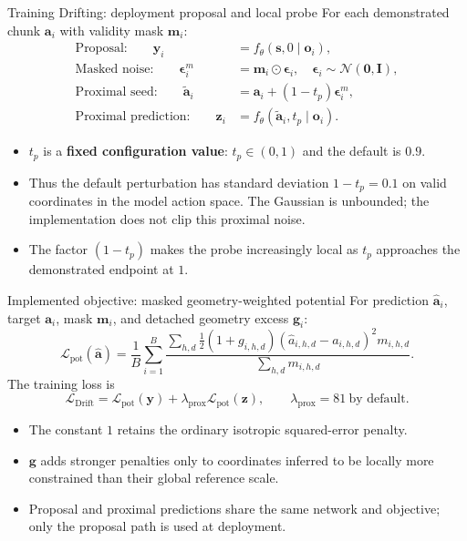 \documentclass[aspectratio=169,10pt]{beamer}
\newcommand{\vect}[1]{\mathbf{#1}}
\begin{document}
\begin{frame}{Training Drifting: deployment proposal and local probe}
  \small
  For each demonstrated chunk $\vect{a}_i$ with validity mask $\vect{m}_i$:
  \begin{align*}
    \text{Proposal:}\qquad
      \vect{y}_i
      &= f_\theta(\vect{s},0\mid\vect{o}_i),\\
    \text{Masked noise:}\qquad
      \boldsymbol{\epsilon}_i^{m}
      &= \vect{m}_i\odot\boldsymbol{\epsilon}_i,
      \quad \boldsymbol{\epsilon}_i\sim\mathcal{N}(\vect{0},\vect{I}),\\
    \text{Proximal seed:}\qquad
      \tilde{\vect{a}}_i
      &= \vect{a}_i+(1-t_p)\boldsymbol{\epsilon}_i^{m},\\
    \text{Proximal prediction:}\qquad
      \vect{z}_i
      &=f_\theta(\tilde{\vect{a}}_i,t_p\mid\vect{o}_i).
  \end{align*}

  \begin{itemize}
    \item $t_p$ is a \textbf{fixed configuration value}:
          $t_p\in(0,1)$ and the default is $0.9$.
    \item Thus the default perturbation has standard deviation $1-t_p=0.1$ on
          valid coordinates in the model action space. The Gaussian is unbounded;
          the implementation does not clip this proximal noise.
    \item The factor $(1-t_p)$ makes the probe increasingly local as $t_p$
          approaches the demonstrated endpoint at $1$.
  \end{itemize}
\end{frame}

\begin{frame}{Implemented objective: masked geometry-weighted potential}
  \small
  For prediction $\hat{\vect{a}}_i$, target $\vect{a}_i$, mask $\vect{m}_i$,
  and detached geometry excess $\vect{g}_i$:
  \[
    \mathcal{L}_{\mathrm{pot}}(\hat{\vect{a}})
    =
    \frac{1}{B}\sum_{i=1}^{B}
    \frac{
      \sum_{h,d}
      \frac{1}{2}(1+g_{i,h,d})
      (\hat a_{i,h,d}-a_{i,h,d})^2m_{i,h,d}
    }{
      \sum_{h,d}m_{i,h,d}
    }.
  \]
  The training loss is
  \[
    \mathcal{L}_{\mathrm{Drift}}
    =
    \mathcal{L}_{\mathrm{pot}}(\vect{y})
    +
    \lambda_{\mathrm{prox}}\mathcal{L}_{\mathrm{pot}}(\vect{z}),
    \qquad
    \lambda_{\mathrm{prox}}=81\ \text{by default}.
  \]

  \begin{itemize}
    \item The constant $1$ retains the ordinary isotropic squared-error penalty.
    \item $\vect{g}$ adds stronger penalties only to coordinates inferred to be
          locally more constrained than their global reference scale.
    \item Proposal and proximal predictions share the same network and objective;
          only the proposal path is used at deployment.
  \end{itemize}
\end{frame}
\end{document}
